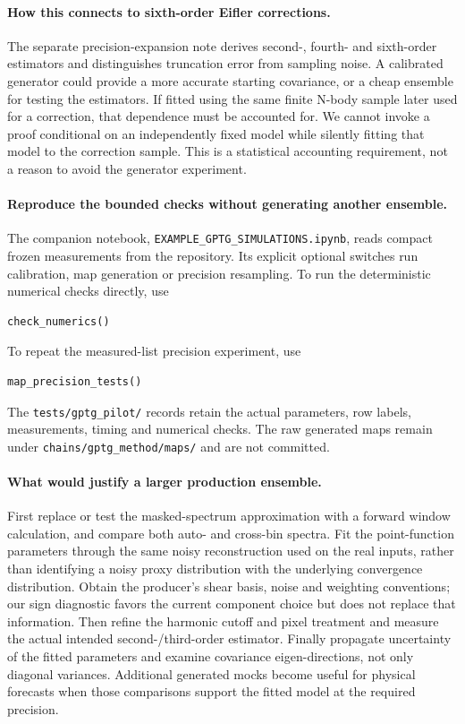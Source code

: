 \documentclass[11pt]{article}
\begin{document}
\paragraph{How this connects to sixth-order Eifler corrections.}
The separate precision-expansion note derives second-, fourth- and
sixth-order estimators and distinguishes truncation error from sampling
noise. A calibrated generator could provide a more accurate starting
covariance, or a cheap ensemble for testing the estimators. If fitted
using the same finite N-body sample later used for a correction, that
dependence must be accounted for. We cannot invoke a proof conditional
on an independently fixed model while silently fitting that model to the
correction sample. This is a statistical accounting requirement, not a
reason to avoid the generator experiment.

\paragraph{Reproduce the bounded checks without generating another ensemble.}
The companion notebook, \texttt{EXAMPLE\_GPTG\_SIMULATIONS.ipynb}, reads
compact frozen measurements from the repository. Its explicit optional
switches run calibration, map generation or precision resampling. To run
the deterministic numerical checks directly, use
\begin{lstlisting}
check_numerics()
\end{lstlisting}
To repeat the measured-list precision experiment, use
\begin{lstlisting}
map_precision_tests()
\end{lstlisting}
The \texttt{tests/gptg\_pilot/} records retain the actual parameters, row
labels, measurements, timing and numerical checks. The raw generated maps
remain under \texttt{chains/gptg\_method/maps/} and are not committed.

\paragraph{What would justify a larger production ensemble.}
First replace or test the masked-spectrum approximation with a forward
window calculation, and compare both auto- and cross-bin spectra. Fit the
point-function parameters through the same noisy reconstruction used on
the real inputs, rather than identifying a noisy proxy distribution with
the underlying convergence distribution. Obtain the producer's shear basis,
noise and weighting conventions; our sign diagnostic favors the current
component choice but does not replace that information. Then refine the
harmonic cutoff and pixel treatment and measure the actual intended
second-/third-order estimator. Finally propagate uncertainty of the fitted
parameters and examine covariance eigen-directions, not only diagonal
variances. Additional generated mocks become useful for physical forecasts
when those comparisons support the fitted model at the required precision.
\end{document}
